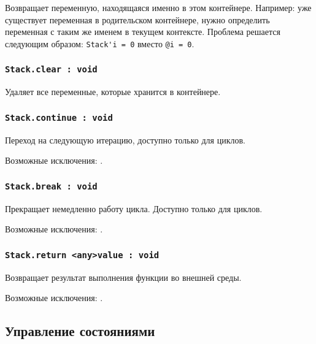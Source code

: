 Возвращает переменную, находящаяся именно в этом контейнере. Например: уже существует переменная  в родительском контейнере, нужно определить переменная с таким же именем в текущем контексте. Проблема решается следующим образом: \lstinline|Stack'i = 0| вместо \lstinline|@i = 0|.

\subsubsection{\lstinline|Stack.clear : void|}

Удаляет все переменные, которые хранится в контейнере.

\subsubsection{\lstinline|Stack.continue : void|}

Переход на следующую итерацию, доступно только для циклов.

Возможные исключения: .

\subsubsection{\lstinline|Stack.break : void|}

Прекращает немедленно работу цикла. Доступно только для циклов.

Возможные исключения: .

\subsubsection{\lstinline|Stack.return <any>value : void|}

Возвращает результат выполнения функции во внешней среды.

Возможные исключения: .

\subsection{Управление состояниями}


